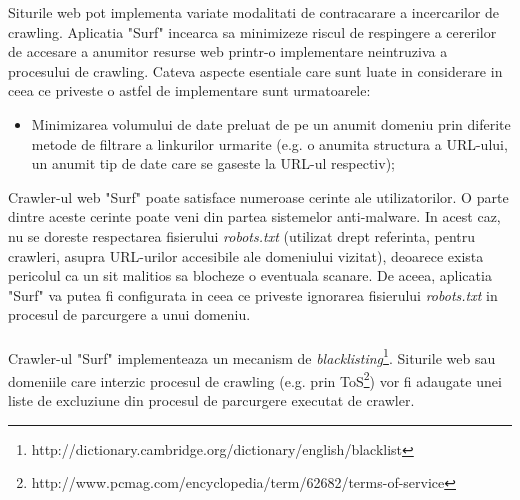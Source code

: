 \newcommand{\blacklistingDefinition}{http://dictionary.cambridge.org/dictionary/english/blacklist}
\newcommand{\tosDefinition}{http://www.pcmag.com/encyclopedia/term/62682/terms-of-service}

Siturile web pot implementa variate modalitati de contracarare a incercarilor de crawling. Aplicatia "Surf" incearca sa minimizeze riscul de respingere a cererilor de accesare a anumitor resurse web printr-o implementare neintruziva a procesului de crawling. Cateva aspecte esentiale care sunt luate in considerare in ceea ce priveste o astfel de implementare sunt urmatoarele:

\begin{itemize}

	\item{Minimizarea volumului de date preluat de pe un anumit domeniu prin diferite metode de filtrare a linkurilor urmarite (e.g. o anumita structura a URL-ului, un anumit tip de date care se gaseste la URL-ul respectiv);}
	
	
\end{itemize}

\noindent
Crawler-ul web "Surf" poate satisface numeroase cerinte ale utilizatorilor. O parte dintre aceste cerinte poate veni din partea sistemelor anti-malware. In acest caz, nu se doreste respectarea fisierului \emph{robots.txt} (utilizat drept referinta, pentru crawleri, asupra URL-urilor accesibile ale domeniului vizitat), deoarece exista pericolul ca un sit malitios sa blocheze o eventuala scanare. De aceea, aplicatia "Surf" va putea fi configurata in ceea ce priveste ignorarea fisierului \emph{robots.txt} in procesul de parcurgere a unui domeniu.
\\
\\
Crawler-ul "Surf" implementeaza un mecanism de \emph{blacklisting}\footnote{\blacklistingDefinition}. Siturile web sau domeniile care interzic procesul de crawling (e.g. prin ToS\footnote{\tosDefinition}) vor fi adaugate unei liste de excluziune din procesul de parcurgere executat de crawler.

